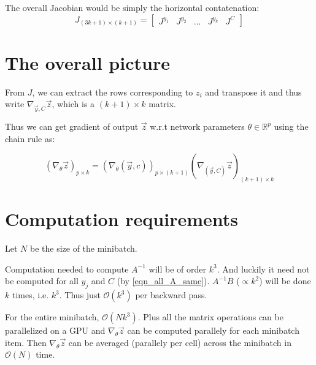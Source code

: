 \documentclass[11 pt]{article}
\begin{document}
The overall Jacobian would be simply the horizontal contatenation:
\begin{equation}
    J_{(3k+1)\times (k+1)} = \begin{bmatrix}J^{y_1}&J^{y_2}&...&J^{y_k}&J^C\end{bmatrix}
\end{equation}


\section{The overall picture}

From $J$, we can extract the rows corresponding to $z_i$ and transpose it and thus write $\nabla_{\vec{y},C}{\vec{z}}$, which is a $(k+1) \times k$ matrix.

Thus we can get gradient of output $\vec{z}$ w.r.t network parameters $\theta \in \mathbb{R}^p$ using the chain rule as:

\[(\nabla_{\theta}\vec{z})_{p \times k} = (\nabla_{\theta}(\vec{y},c))_{p \times (k+1)} (\nabla_{(\vec{y},C)}\vec{z})_{(k+1) \times k}\]


\section{Computation requirements}
Let $N$ be the size of the minibatch.

Computation needed to compute $A^{-1}$ will be of order $k^3$. And luckily it need not be computed for all $y_j$ and $C$ (by \ref{eqn_all_A_same}). $A^{-1}B$ ($\propto k^2$) will be done $k$ times, i.e. $k^3$.
Thus just $\mathcal{O}(k^3)$ per backward pass.

For the entire minibatch, $\mathcal{O}(N k^3)$. Plus all the matrix operations can be parallelized on a GPU and $\nabla_{\theta}\vec{z}$ can be computed parallely for each minibatch item. Then $\nabla_{\theta}\vec{z}$ can be averaged (parallely per cell) across the minibatch in $\mathcal{O}(N)$ time.
\end{document}
